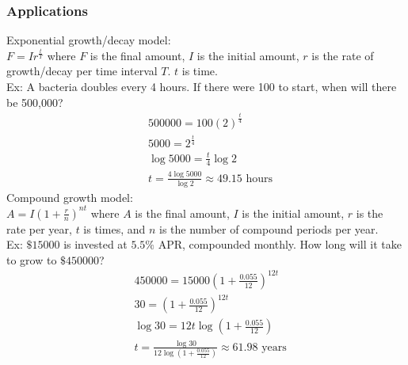 \subsubsection{Applications}
Exponential growth/decay model:\\
$F=Ir^{\frac{t}{T}}$ where $F$ is the final amount, $I$ is the initial amount, $r$ is the rate of growth/decay per time interval $T$. $t$ is time.\\
Ex: A bacteria doubles every 4 hours. If there were 100 to start, when will there be 500,000?
\begin{align*}
    &500000=100(2)^{\frac{t}{4}}\\
    &5000=2^\frac{t}{4}\\
    &\log5000=\frac{t}{4}\log2\\
    &t=\frac{4\log5000}{\log2}\approx49.15\text{ hours}
\end{align*}
Compound growth model:\\
$A=I\left(1+\frac{r}{n}\right)^{nt}$ where $A$ is the final amount, $I$ is the initial amount, $r$ is the rate per year, $t$ is times, and $n$ is the number of compound periods per year.\\
Ex: $\$15000$ is invested at $5.5\%$ APR, compounded monthly. How long will it take to grow to $\$450000$?
\begin{align*}
    &450000=15000\left(1+\frac{0.055}{12}\right)^{12t}\\
    &30=\left(1+\frac{0.055}{12}\right)^{12t}\\
    &\log30=12t\log\left(1+\frac{0.055}{12}\right)\\
    &t=\frac{\log30}{12\log\left(1+\frac{0.055}{12}\right)}\approx61.98\text{ years}
\end{align*}